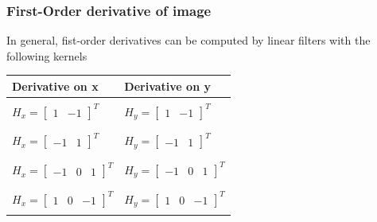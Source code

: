 \documentclass[english,11pt,table,handout]{beamer}
\begin{document}
\frame
{
	\frametitle{First-Order derivative of image}
	In general, fist-order derivatives can be computed by linear filters with the following kernels 
	\newline
	\centering
	
	\begin{tabular}{|l||l|}
		\hline
		Derivative on x & Derivative on y \\
		\hline
		 & \\
		$H_{x} = \left[ \begin{array}{cc} 1 & -1 \end{array}\right]^T$ &
		$H_{y} = \left[ \begin{array}{cc} 1 & -1 \end{array}\right]^T$\\
		&\\
		\hline 
		& \\
		$H_{x} = \left[ \begin{array}{cc} -1 & 1 \end{array}\right]^T$ &
		$H_{y} = \left[ \begin{array}{cc} -1 & 1 \end{array}\right]^T$\\ 
			&\\
			\hline 
			& \\
		$H_{x} = \left[ \begin{array}{ccc} -1 & 0 & 1 \end{array}\right]^T$ &
		$H_{y} = \left[ \begin{array}{ccc} -1 & 0 & 1 \end{array}\right]^T$\\
			&\\
			\hline 
			& \\
		$H_{x} = \left[ \begin{array}{ccc} 1 & 0 & -1 \end{array}\right]^T$ &
		$H_{y} = \left[ \begin{array}{ccc} 1 & 0 & -1 \end{array}\right]^T$\\
		&\\
		\hline
	\end{tabular}
	
}
\frame
\end{document}
